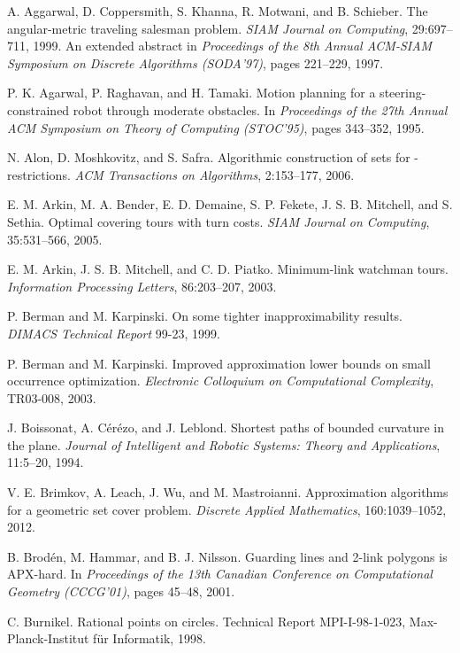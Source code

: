 \documentclass[letterpaper,11pt]{article}
\begin{document}
\begin{thebibliography}{99}

A. Aggarwal, D. Coppersmith, S. Khanna, R. Motwani, and B. Schieber.
The angular-metric traveling salesman problem.
\emph{SIAM Journal on Computing},
29:697--711, 1999.
An extended abstract in \emph{Proceedings of the 8th Annual ACM-SIAM
  Symposium on Discrete Algorithms (SODA'97)}, 
pages 221--229, 1997.

P. K. Agarwal, P. Raghavan, and H. Tamaki.
Motion planning for a steering-constrained robot through moderate obstacles.
In \emph{Proceedings of the 27th Annual ACM Symposium on Theory of
  Computing (STOC'95)}, 
pages 343--352, 1995.

N. Alon, D. Moshkovitz, and S. Safra.
Algorithmic construction of sets for -restrictions.
\emph{ACM Transactions on Algorithms},
2:153--177, 2006.

E. M. Arkin, M. A. Bender, E. D. Demaine, S. P. Fekete,
J. S. B. Mitchell, and S. Sethia. 
Optimal covering tours with turn costs.
\emph{SIAM Journal on Computing},
35:531--566, 2005.

E. M. Arkin, J. S. B. Mitchell, and C. D. Piatko.
Minimum-link watchman tours.
\emph{Information Processing Letters},
86:203--207, 2003.

P. Berman and M. Karpinski.
On some tighter inapproximability results.
\emph{DIMACS Technical Report} 99-23, 1999.

P. Berman and M. Karpinski.
Improved approximation lower bounds on small occurrence optimization.
\emph{Electronic Colloquium on Computational Complexity},
TR03-008, 2003.

J. Boissonat, A. C{\'e}r{\'e}zo, and J. Leblond.
Shortest paths of bounded curvature in the plane.
\emph{Journal of Intelligent and Robotic Systems: Theory and Applications},
11:5--20, 1994.

V. E. Brimkov, A. Leach, J. Wu, and M. Mastroianni.
Approximation algorithms for a geometric set cover problem.
\emph{Discrete Applied Mathematics},
160:1039--1052, 2012.

B. Brod\'en, M. Hammar, and B. J. Nilsson.
Guarding lines and 2-link polygons is APX-hard.
In \emph{Proceedings of the 13th Canadian Conference on Computational
  Geometry (CCCG'01)}, 
pages 45--48, 2001.

C. Burnikel.
Rational points on circles.
Technical Report MPI-I-98-1-023,
Max-Planck-Institut f{\"u}r Informatik,
1998.


\end{thebibliography}
\end{document}

